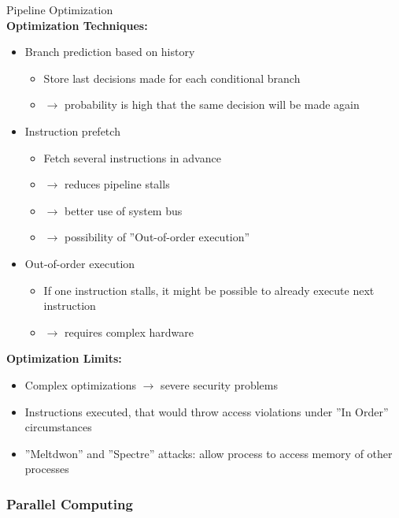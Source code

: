 \begin{corollary}{Pipeline Optimization}\\
\textbf{Optimization Techniques:}
\begin{itemize}
  \item Branch prediction based on history
  \begin{itemize}
    \item Store last decisions made for each conditional branch
    \item $\rightarrow$ probability is high that the same decision will be made again
  \end{itemize}
  \item Instruction prefetch
  \begin{itemize}
    \item Fetch several instructions in advance
    \item $\rightarrow$ reduces pipeline stalls
    \item $\rightarrow$ better use of system bus
    \item $\rightarrow$ possibility of ''Out-of-order execution''
  \end{itemize}
  \item Out-of-order execution
  \begin{itemize}
    \item If one instruction stalls, it might be possible to already execute next instruction
    \item $\rightarrow$ requires complex hardware
  \end{itemize}
\end{itemize}

\textbf{Optimization Limits:}
\begin{itemize}
  \item Complex optimizations $\rightarrow$ severe security problems 
  \item Instructions executed, that would throw access violations under ''In Order'' circumstances
  \item ''Meltdwon'' and ''Spectre'' attacks: allow process to access memory of other processes
\end{itemize}
\end{corollary}



\pagebreak

\subsubsection{Parallel Computing}

